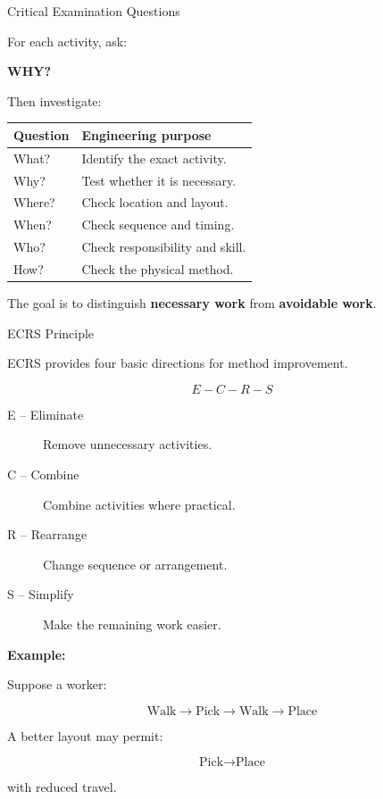 \documentclass[aspectratio=169,10pt]{beamer}
\begin{document}
\begin{frame}[shrink=18]{Critical Examination Questions}
\small

For each activity, ask:

\begin{center}
\Large
\textbf{WHY?}
\end{center}

Then investigate:

\begin{tabularx}{\textwidth}{YY}
\toprule
Question & Engineering purpose \\
\midrule
What? & Identify the exact activity.\\
Why? & Test whether it is necessary.\\
Where? & Check location and layout.\\
When? & Check sequence and timing.\\
Who? & Check responsibility and skill.\\
How? & Check the physical method.\\
\bottomrule
\end{tabularx}

\vspace{4pt}

The goal is to distinguish \textbf{necessary work} from
\textbf{avoidable work}.

\end{frame}


\begin{frame}[shrink=18]{ECRS Principle}
\small

ECRS provides four basic directions for method improvement.

\[
\boxed{
E-C-R-S
}
\]

\begin{description}
    \item[E -- Eliminate] Remove unnecessary activities.
    \item[C -- Combine] Combine activities where practical.
    \item[R -- Rearrange] Change sequence or arrangement.
    \item[S -- Simplify] Make the remaining work easier.
\end{description}

\vspace{5pt}

\textbf{Example:}

Suppose a worker:

\[
\text{Walk} \rightarrow \text{Pick} \rightarrow
\text{Walk} \rightarrow \text{Place}
\]

A better layout may permit:

\[
\text{Pick} \rightarrow \text{Place}
\]

with reduced travel.

\end{frame}
\end{document}
